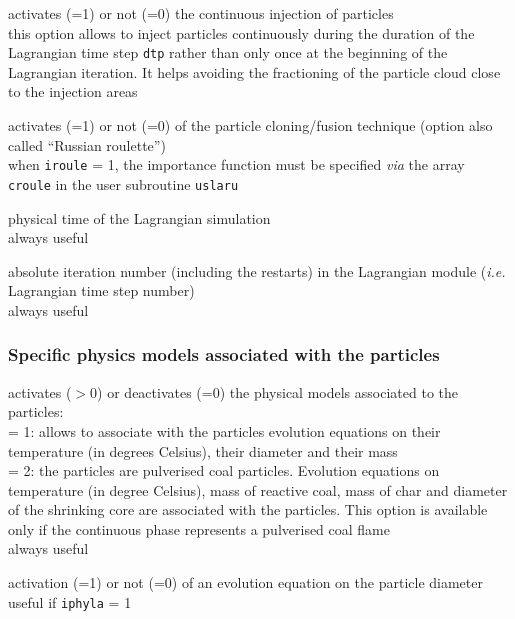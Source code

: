{activates (=1) or not (=0) the continuous injection of particles\\
this option allows to inject particles continuously during the duration of the
Lagrangian time step \texttt{dtp} rather than only once at the
beginning of the Lagrangian iteration. It helps avoiding the fractioning of
the particle cloud close to the injection areas}

{activates (=1) or not (=0) of the particle cloning/fusion technique
(option also called ``Russian roulette'')\\
when \texttt{iroule} = 1, the importance function must be specified {\em via} the
array \texttt{croule} in the user subroutine \texttt{uslaru}}

{physical time of the Lagrangian simulation \\
always useful}

{absolute iteration number (including the restarts) in the Lagrangian
module ({\em i.e.} Lagrangian time step number) \\
always useful}


\subsubsection{Specific physics models associated with the particles}

{activates ($>$0) or deactivates (=0) the physical models associated to the
particles:\\
\hspace*{1.3cm} = 1: allows to associate with the particles evolution
equations on their temperature (in degrees Celsius), their diameter and
their mass\\
\hspace*{1.3cm} = 2: the particles are pulverised coal particles.
Evolution equations on temperature (in degree Celsius), mass of
reactive coal, mass of char and diameter of the shrinking core are
associated with the particles. This option is available only if the
continuous phase represents a pulverised coal flame\\
always useful}

{activation (=1) or not (=0) of an evolution equation on the particle
diameter\\
useful if \texttt{iphyla} = 1}


